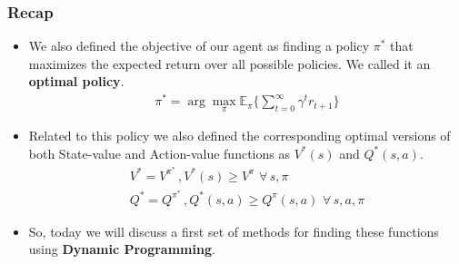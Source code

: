 \begin{frame}
    \frametitle{Recap}

    \begin{itemize}
        \item We also defined the objective of our agent as finding a policy $\pi^{*}$ that
              maximizes the expected return over all possible policies. We called it an 
              \textbf{optimal policy}.
              \begin{gather*}
                \pi^{*} = \arg \max_{\pi} \mathbb{E}_{\pi} \lbrace \sum_{t=0}^{\infty} \gamma^{t} r_{t+1} \rbrace
              \end{gather*}

        \pause

        \item Related to this policy we also defined the corresponding optimal versions
              of both State-value and Action-value functions as $V^{*}(s)$ and $Q^{*}(s,a)$.
              \begin{gather*}
                V^{*} = V^{\pi^{*}} \,, V^{*}(s) \geq V^{\pi} \,\, \forall \, s,\pi \\
                Q^{*} = Q^{\pi^{*}} \,, Q^{*}(s,a) \geq Q^{\pi}(s,a) \,\, \forall \, s,a,\pi
              \end{gather*}

        \pause

        \item So, today we will discuss a first set of methods for finding these functions using
              \textbf{Dynamic Programming}.
    \end{itemize}

\end{frame}